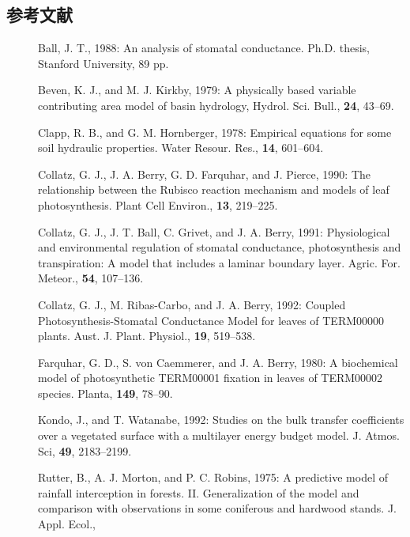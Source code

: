 \subsection*{参考文献}

\begin{description}
 \item[] Ball, J. T., 1988: An analysis of stomatal
            conductance. Ph.D. thesis, Stanford University, 89 pp.
 \item[] Beven, K. J., and M. J. Kirkby, 1979: A physically based
            variable contributing area model of basin hydrology,
            {Hydrol. Sci. Bull.}, {\bf 24}, 43--69.
 \item[] Clapp, R. B., and G. M. Hornberger, 1978: Empirical equations
            for some soil hydraulic properties. {Water Resour. Res.},
            {\bf 14}, 601--604.
 \item[] Collatz, G. J., J. A. Berry, G. D. Farquhar, and J. Pierce,
            1990: The relationship between the Rubisco reaction
            mechanism and models of leaf photosynthesis. {Plant Cell
            Environ.}, {\bf 13}, 219--225.
 \item[] Collatz, G. J., J. T. Ball, C. Grivet, and J. A. Berry, 1991:
            Physiological and environmental regulation of stomatal
            conductance, photosynthesis and transpiration: A model that
            includes a laminar boundary layer. {Agric. For. Meteor.},
            {\bf 54}, 107--136.
 \item[] Collatz, G. J., M. Ribas-Carbo, and J. A. Berry, 1992: Coupled
            Photosynthesis-Stomatal Conductance Model for leaves of
            TERM00000 plants. {Aust. J. Plant. Physiol.}, {\bf 19},
            519--538.
 \item[] Farquhar, G. D., S. von Caemmerer, and J. A. Berry, 1980: A
            biochemical model of photosynthetic TERM00001 fixation in
            leaves of TERM00002 species. {Planta}, {\bf 149}, 78--90.
 \item[] Kondo, J., and T. Watanabe, 1992: Studies on the bulk transfer
            coefficients over a vegetated surface with a multilayer
            energy budget model. {J. Atmos. Sci}, {\bf 49}, 2183--2199.
 \item[] Rutter, B., A. J. Morton, and P. C. Robins, 1975: A predictive
            model of rainfall interception in forests. II.
            Generalization of the model and comparison with observations
            in some coniferous and hardwood stands. {J. Appl. Ecol.},

\end{description}

